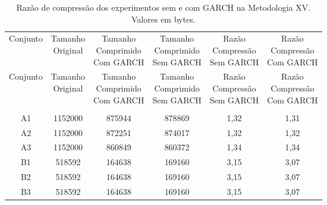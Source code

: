 \begin{center}
\begin{longtable}{cccccc}
\toprule
\rowcolor{white}
\caption[Metodologia XV: Razão de compressão]{Razão de compressão dos
experimentos sem e com GARCH na Metodologia XV.
Valores em bytes.} \label{Tab:razaocompressaoMet} \\
\midrule
Conjunto & \specialcell{Tamanho \\Original} & \specialcell{Tamanho
\\Comprimido\\Com GARCH} & \specialcell{Tamanho
\\Comprimido\\Sem GARCH} & \specialcell{Razão \\Compressão
\\Sem GARCH} & \specialcell{Razão \\Compressão
\\Com GARCH} \\
\midrule
\endfirsthead
\midrule
\rowcolor{white}
Conjunto & \specialcell{Tamanho \\Original} & \specialcell{Tamanho
\\Comprimido\\Com GARCH} & \specialcell{Tamanho
\\Comprimido\\Sem GARCH} & \specialcell{Razão \\Compressão
\\Sem GARCH} & \specialcell{Razão \\Compressão
\\Com GARCH} \\
\toprule
\endhead
\midrule \\ %
\endfoot
\bottomrule
\endlastfoot
    A1    & 1152000 & 875944 & 878869 & 1,32  & 1,31 \\
    A2    & 1152000 & 872251 & 874017 & 1,32  & 1,32 \\
    A3    & 1152000 & 860849 & 860372 & 1,34  & 1,34 \\
    B1    & 518592 & 164638 & 169160 & 3,15  & 3,07 \\
    B2    & 518592 & 164638 & 169160 & 3,15  & 3,07 \\
    B3    & 518592 & 164638 & 169160 & 3,15  & 3,07 \\

\end{longtable}
\end{center}
